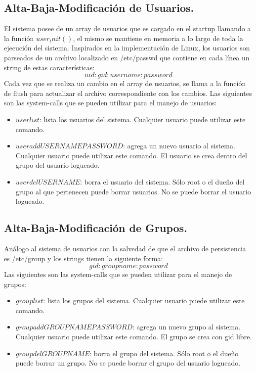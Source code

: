 \documentclass[english]{article}
\begin{document}
\subsection{Alta-Baja-Modificación de Usuarios.}
El sistema posee de un array de usuarios que es cargado en el startup llamando a la función $user_init()$, el mismo se mantiene en memoria a lo largo de toda la ejecución del sistema. Inspirados en la implementación de Linux, los usuarios son parseados de un archivo localizado en /etc/passwd que contiene en cada línea un string de estas características:
$$uid:gid:username:password$$
Cada vez que se realiza un cambio en el array de usuarios, se llama a la función de flush para actualizar el archivo correspondiente con los cambios.
Las siguientes son las system-calls que se pueden utilizar para el manejo de usuarios:
\begin{itemize}

\item $userlist$: lista los usuarios del sistema.
\subitem Cualquier usuario puede utilizar este comando.

\item $useradd USERNAME PASSWORD$: agrega un nuevo usuario al sistema.
\subitem Cualquier usuario puede utilizar este comando.
\subitem El usuario se crea dentro del grupo del usuario logueado.

\item $userdel USERNAME$: borra el usuario del sistema.
\subitem Sólo root o el dueño del grupo al que pertenecen puede borrar usuarios.
\subitem No se puede borrar el usuario logueado.

\end{itemize}
 
\subsection{Alta-Baja-Modificación de Grupos.}
Análogo al sistema de usuarios con la salvedad de que el archivo de persistencia es /etc/group y los strings tienen la siguiente forma:
$$gid:groupname:password$$
Las siguientes son las system-calls que se pueden utilizar para el manejo de grupos:
\begin{itemize}

\item $grouplist$: lista los grupos del sistema.
\subitem Cualquier usuario puede utilizar este comando.

\item $groupadd GROUPNAME PASSWORD$: agrega un nuevo grupo al sistema.
\subitem Cualquier usuario puede utilizar este comando.
\subitem El grupo se crea con gid libre.

\item $groupdel GROUPNAME$: borra el grupo del sistema.
\subitem Sólo root o el dueño puede borrar un grupo.
\subitem No se puede borrar el grupo del usuario logueado.

\end{itemize}
\end{document}

